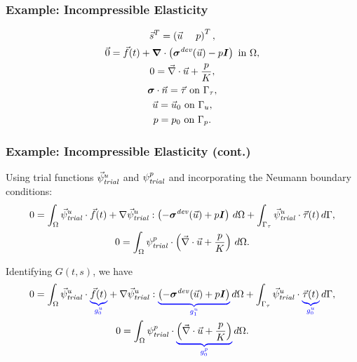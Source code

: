 \documentclass[aspectratio=169]{beamer}
\begin{document}
\begin{frame}
  \frametitle{Example: Incompressible Elasticity}
  \summary{}

  \begin{gather}
    \vec{s}^T = \left( \vec{u} \quad \ p \right)^T, \\
    \vec{0} = \vec{f}(t) + \tensor{\nabla} \cdot \left(\tensor{\sigma}^\mathit{dev}(\vec{u}) - p\tensor{I}\right) \text{ in }\Omega, \\
    0 = \vec{\nabla} \cdot \vec{u} + \frac{p}{K}, \\
    \tensor{\sigma} \cdot \vec{n} = \vec{\tau} \text{ on }\Gamma_\tau, \\
    \vec{u} = \vec{u}_0 \text{ on }\Gamma_u, \\
    p = p_0 \text{ on }\Gamma_p.
  \end{gather}

\end{frame}

\begin{frame}
  \frametitle{Example: Incompressible Elasticity (cont.)}
  \summary{}

  Using trial functions $\trialvec[u]$ and $\trialscalar[p]$ and
  incorporating the Neumann boundary conditions:
  \begin{gather}
  0 = \int_\Omega \trialvec[u] \cdot \vec{f}(t) + \nabla \trialvec[u] : \left(-\tensor{\sigma}^\mathit{dev}(\vec{u}) + p\tensor{I}
  \right)\, d\Omega + \int_{\Gamma_\tau} \trialvec[u] \cdot \vec{\tau}(t) \, d\Gamma, \\
  0 = \int_\Omega \trialscalar[p] \cdot \left(\vec{\nabla} \cdot \vec{u} + \frac{p}{K} \right) 
\, d\Omega.
\end{gather}

Identifying $G(t,s)$, we have
\begin{gather}
  0 = \int_\Omega \trialvec[u] \cdot \eqnannotate{\vec{f}(t)}{g_0^u} + \nabla \trialvec[u] :
  \eqnannotate{\left(-\tensor{\sigma}^\mathit{dev}(\vec{u}) + p\tensor{I}\right)}{g_1^u}  \, d\Omega
  + \int_{\Gamma_\tau} \trialvec[u] \cdot \eqnannotate{\vec{\tau}(t)}{g_0^u} \, d\Gamma, \\
%
  0 = \int_\Omega \trialscalar[p] \cdot \eqnannotate{\left(\vec{\nabla} \cdot \vec{u} + 
\frac{p}{K} \right)}{g_0^p} \, d\Omega.
\end{gather}

\end{frame}
\end{document}

